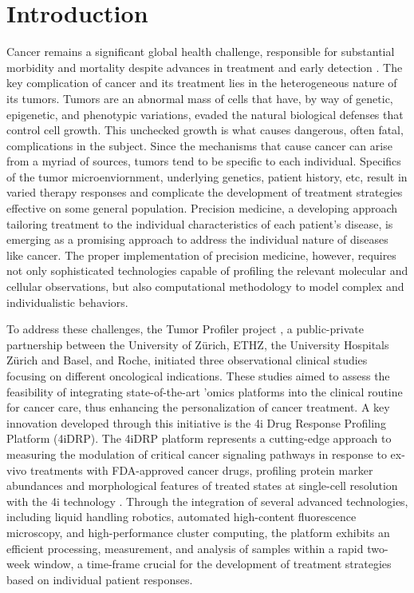 
\section{Introduction}
Cancer remains a significant global health challenge, responsible for substantial morbidity and mortality despite advances in treatment and early detection \cite{miller2022}.
The key complication of cancer and its treatment lies in the heterogeneous nature of its tumors.
Tumors are an abnormal mass of cells that have, by way of genetic, epigenetic, and phenotypic variations, evaded the natural biological defenses that control cell growth.
This unchecked growth is what causes dangerous, often fatal, complications in the subject.
Since the mechanisms that cause cancer can arise from a myriad of sources, tumors tend to be specific to each individual.
Specifics of the tumor microenviornment, underlying genetics, patient history, etc,
result in varied therapy responses and complicate the development of treatment strategies effective on some general population.
Precision medicine, a developing approach tailoring treatment to the individual characteristics of each patient's disease,
is emerging as a promising approach to address the individual nature of diseases like cancer.
The proper implementation of precision medicine, however, requires not only sophisticated technologies capable of profiling the relevant molecular and cellular observations,
but also computational methodology to model complex and individualistic behaviors.

To address these challenges, the Tumor Profiler project \cite{irmisch2021}, a public-private partnership between the University of Zürich, ETHZ, the University Hospitals Zürich and Basel, and Roche, initiated three observational clinical studies focusing on different oncological indications.
These studies aimed to assess the feasibility of integrating state-of-the-art 'omics platforms into the clinical routine for cancer care, thus enhancing the personalization of cancer treatment.
A key innovation developed through this initiative is the 4i Drug Response Profiling Platform (4iDRP).
The 4iDRP platform represents a cutting-edge approach to measuring the modulation of critical cancer signaling pathways in response to ex-vivo treatments with FDA-approved cancer drugs,
profiling protein marker abundances and morphological features of treated states at single-cell resolution with the 4i technology \cite{gut2018}.
Through the integration of several advanced technologies, including liquid handling robotics, automated high-content fluorescence microscopy, and high-performance cluster computing,
the platform exhibits an efficient processing, measurement, and analysis of samples within a rapid two-week window,
a time-frame crucial for the development of treatment strategies based on individual patient responses.

